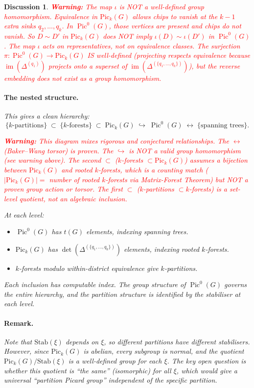 \documentclass[11pt]{article}
\newcommand{\warning}[1]{\textcolor{red}{\textbf{Warning:} #1}}
\newcommand{\Pic}{\operatorname{Pic}^0}
\newtheorem{answer}{Discussion}
\begin{document}
\begin{answer}
\warning{The map $\iota$ is NOT a well-defined group homomorphism. Equivalence
in $\mathrm{Pic}_k(G)$ allows chips to vanish at the $k-1$ extra sinks
$q_2, \ldots, q_k$. In $\Pic(G)$, those vertices are present and chips do not
vanish. So $D \sim D'$ in $\mathrm{Pic}_k(G)$ does NOT imply
$\iota(D) \sim \iota(D')$ in $\Pic(G)$. The map $\iota$ acts on
representatives, not on equivalence classes. The surjection
$\pi : \Pic(G) \to \mathrm{Pic}_k(G)$ IS well-defined (projecting respects
equivalence because $\operatorname{im}(\Delta^{(q_1)})$ projects onto a
superset of $\operatorname{im}(\Delta^{(\{q_1,\ldots,q_k\})})$), but the
reverse embedding does not exist as a group homomorphism.}

\paragraph{The nested structure.}
This gives a clean hierarchy:
\[
  \{k\text{-partitions}\}
    \;\subset\; \{k\text{-forests}\}
    \;\subset\; \mathrm{Pic}_k(G)
    \;\hookrightarrow\; \Pic(G)
    \;\longleftrightarrow\; \{\text{spanning trees}\}.
\]

\warning{This diagram mixes rigorous and conjectured relationships. The
$\longleftrightarrow$ (Baker--Wang torsor) is proven. The $\hookrightarrow$ is
NOT a valid group homomorphism (see warning above). The second $\subset$
($k$-forests $\subset \mathrm{Pic}_k(G)$) assumes a bijection between
$\mathrm{Pic}_k(G)$ and rooted $k$-forests, which is a counting match
($|\mathrm{Pic}_k(G)| = $ number of rooted $k$-forests via Matrix-Forest
Theorem) but NOT a proven group action or torsor. The first $\subset$
($k$-partitions $\subset k$-forests) is a set-level quotient, not an algebraic
inclusion.}

At each level:
\begin{itemize}
  \item $\Pic(G)$ has $t(G)$ elements, indexing spanning trees.
  \item $\mathrm{Pic}_k(G)$ has $\det(\Delta^{(\{q_1,\ldots,q_k\})})$
    elements, indexing rooted $k$-forests.
  \item $k$-forests modulo within-district equivalence give $k$-partitions.
\end{itemize}
Each inclusion has computable index. The group structure of $\Pic(G)$ governs
the entire hierarchy, and the partition structure is identified by the
stabiliser at each level.

\paragraph{Remark.}
Note that $\mathrm{Stab}(\xi)$ depends on $\xi$, so different partitions have
different stabilisers. However, since $\mathrm{Pic}_k(G)$ is abelian, every
subgroup is normal, and the quotient $\mathrm{Pic}_k(G) / \mathrm{Stab}(\xi)$
is a well-defined group for each $\xi$. The key open question is whether this
quotient is ``the same'' (isomorphic) for all $\xi$, which would give a
universal ``partition Picard group'' independent of the specific partition.
\end{answer}
\end{document}
